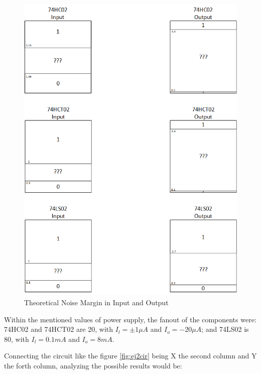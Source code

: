 	 \begin{figure}[h!]
        \centering
        \includegraphics[scale=0.5]{dataaa2.png}
        \caption{\color{cyan}Theoretical Noise Margin in Input and Output}
        \label{fig:ej2thnm}
    \end{figure}
    
    Within the mentioned values of power supply, the fanout of the components were: 74HC02 and 74HCT02 are 20, with $I_l =\pm1{\mu}A$ and $I_o=-20{\mu}A$; and 74LS02 is 80, with $I_l =0.1mA$ and $I_o=8mA$.
    
    Connecting the circuit like the figure \ref{fig:ej2cir} being X the second column and Y the forth column, analyzing the possible results would be:

